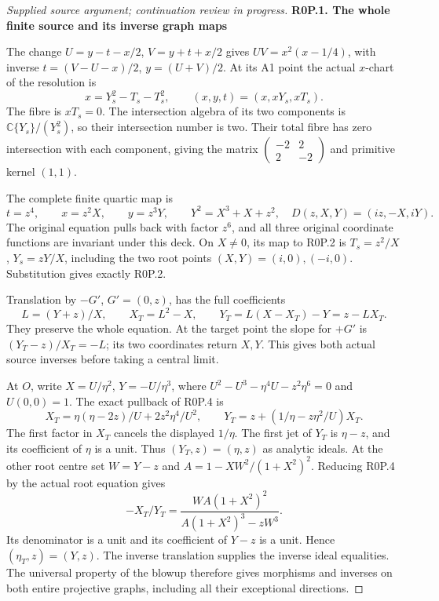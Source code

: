 \begin{proof}[Supplied source argument; continuation review in progress]
\par

\medskip\noindent\textbf{R0P.1. The whole finite source and its inverse graph maps}

\par\nobreak

The change
\(U=y-t-x/2\), \(V=y+t+x/2\) gives
\(UV=x^2(x-1/4)\), with inverse
\(t=(V-U-x)/2\), \(y=(U+V)/2\). At its A1 point the actual
\(x\)-chart of the resolution is
\[
 x=Y_s^2-T_s-T_s^2,\qquad
 (x,y,t)=(x,xY_s,xT_s).
 \tag{R0P.2}
\]
The fibre is \(xT_s=0\). The intersection algebra of its two
components is \(\mathbb C\{Y_s\}/(Y_s^2)\), so their intersection
number is two. Their total fibre has zero intersection with each
component, giving the matrix
\(\left(\begin{smallmatrix}-2&2\\2&-2\end{smallmatrix}\right)\)
and primitive kernel \((1,1)\).

The complete finite quartic map is
\[
 t=z^4,\qquad x=z^2X,\qquad y=z^3Y,
 \qquad Y^2=X^3+X+z^2,
 \quad D(z,X,Y)=(iz,-X,iY).
 \tag{R0P.3}
\]
The original equation pulls back with factor \(z^6\), and all three
original coordinate functions are invariant under this deck. On
\(X\ne0\), its map to R0P.2 is
\(T_s=z^2/X\), \(Y_s=zY/X\), including the two root points
\((X,Y)=(i,0),(-i,0)\). Substitution gives exactly R0P.2.

Translation by \(-G'\), \(G'=(0,z)\), has the full coefficients
\[
 L=(Y+z)/X,\qquad X_T=L^2-X,
 \qquad Y_T=L(X-X_T)-Y=z-LX_T.
 \tag{R0P.4}
\]
They preserve the whole equation. At the target point the slope for
\(+G'\) is \((Y_T-z)/X_T=-L\); its two coordinates return \(X,Y\).
This gives both actual source inverses before taking a central limit.

At \(O\), write \(X=U/\eta^2\), \(Y=-U/\eta^3\), where
\(U^2-U^3-\eta^4U-z^2\eta^6=0\) and \(U(0,0)=1\).
The exact pullback of R0P.4 is
\[
 X_T=\eta(\eta-2z)/U+2z^2\eta^4/U^2,
 \qquad
 Y_T=z+(1/\eta-z\eta^2/U)X_T.
 \tag{R0P.5}
\]
The first factor in \(X_T\) cancels the displayed \(1/\eta\).
The first jet of \(Y_T\) is \(\eta-z\), and its coefficient of
\(\eta\) is a unit. Thus \((Y_T,z)=(\eta,z)\) as analytic
ideals. At the other root centre set \(W=Y-z\) and
\(A=1-XW^2/(1+X^2)^2\). Reducing R0P.4 by the actual root equation
gives
\[
 -X_T/Y_T=
 \frac{W A(1+X^2)^2}{A(1+X^2)^3-zW^3}.
 \tag{R0P.6}
\]
Its denominator is a unit and its coefficient of \(Y-z\) is a
unit. Hence \((\eta_T,z)=(Y,z)\). The inverse translation supplies
the inverse ideal equalities. The universal property of the blowup
therefore gives morphisms and inverses on both entire projective
graphs, including all their exceptional directions.


\end{proof}
